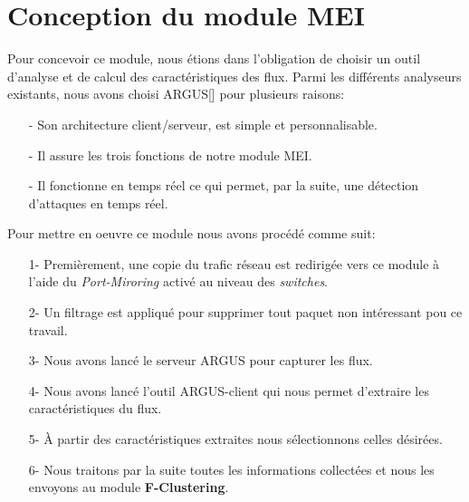 \section{Conception du module MEI}
Pour concevoir ce module, nous étions dans l’obligation de choisir un outil d’analyse et de calcul des caractéristiques des flux. Parmi les différents analyseurs existants, nous avons choisi ARGUS[\cite{31}] pour plusieurs raisons:\\
\begin{itemize}
\item[-] Son architecture client/serveur, est simple et personnalisable.
\item[-] Il assure les trois fonctions de notre module MEI.
\item[-] Il fonctionne en temps réel ce qui permet, par la suite, une détection d'attaques en temps réel.\\
\end{itemize} 
Pour mettre en oeuvre ce module nous avons procédé comme suit:\\
\begin{itemize}
\item[1-] Premièrement, une copie du trafic réseau est redirigée vers ce module à l'aide du \textit{Port-Miroring} activé au niveau des \textit{switches}.\\
\item[2-] Un filtrage est appliqué pour supprimer tout paquet non intéressant pou ce travail.\\
\item[3-] Nous avons lancé le serveur ARGUS pour capturer les flux.\\
\item[4-] Nous avons lancé l’outil ARGUS-client qui nous permet d'extraire les caractéristiques du flux.\\
\item[5-] À partir des caractéristiques extraites nous sélectionnons celles désirées.\\
\item[6-] Nous traitons par la suite toutes les informations collectées et nous les envoyons au module \textbf{F-Clustering}.\\
\end{itemize}

